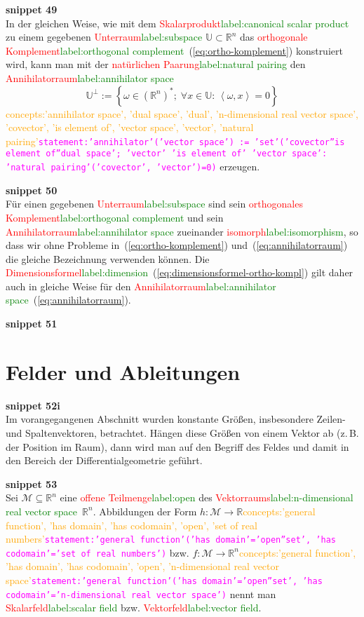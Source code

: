 \documentclass[a4paper,twoside,english,ngerman,deutsch,german,sectrefs,envcountsame,envcountchap]{svmono}
\newcommand{\setref}[2]{\textcolor{red}{#1}\textcolor{green}{#2}}
\newcommand{\snippet}[1]{\textbf{snippet #1}\\}
\newcommand{\eqnote}[2]{\textcolor{orange}{#1}\textcolor{magenta}{\texttt{#2}}}
\begin{document}
\snippet{49}
In der gleichen Weise, wie mit dem \setref{Skalarprodukt}{label:canonical scalar product} zu einem gegebenen \setref{Unterraum}{label:subspace} $\mathbb{U}\subset{\mathbb{R}}^{n}$ das \setref{orthogonale Komplement}{label:orthogonal complement}~(\eqref{eq:ortho-komplement}) konstruiert wird, kann man mit der \setref{natürlichen Paarung}{label:natural pairing} den \setref{Annihilatorraum}{label:annihilator space}
\begin{equation}
\mathbb{U}^{\perp}:=\left\{ \omega\in({\mathbb{R}}^{n})^{*};\;\forall x\in\mathbb{U}:\,\left\langle \omega,x\right\rangle =0\right\} \label{eq:annihilatorraum}
\end{equation}\eqnote{concepts:'annihilator space', 'dual space', 'dual', 'n-dimensional real vector space', 'covector', 'is element of', 'vector space', 'vector', 'natural pairing'}{statement:'annihilator'('vector space') := 'set'('covector''is element of''dual space'; 'vector' 'is element of' 'vector space': 'natural pairing'('covector', 'vector')=0)}
erzeugen.

\snippet{50}
Für einen gegebenen \setref{Unterraum}{label:subspace} sind sein \setref{orthogonales Komplement}{label:orthogonal complement} und sein \setref{Annihilatorraum}{label:annihilator space} zueinander \setref{isomorph}{label:isomorphism}, so dass wir ohne Probleme in~(\eqref{eq:ortho-komplement}) und~(\eqref{eq:annihilatorraum}) die gleiche Bezeichnung verwenden können. Die \setref{Dimensionsformel}{label:dimension}~(\eqref{eq:dimensionsformel-ortho-kompl}) gilt daher auch in gleiche Weise für den \setref{Annihilatorraum}{label:annihilator space}~(\eqref{eq:annihilatorraum}).

\snippet{51}
\section{Felder und Ableitungen\label{sec:Felder-und-Ableitungen}}

\snippet{52i}
Im vorangegangenen Abschnitt wurden konstante Größen, insbesondere Zeilen- und Spaltenvektoren, betrachtet. Hängen diese Größen von einem Vektor ab (z.\,B. der Position im Raum), dann wird man auf den Begriff des Feldes und damit in den Bereich der Differentialgeometrie geführt.

\snippet{53}
Sei $\mathcal{M}\subseteq{\mathbb{R}}^{n}$ eine \setref{offene Teilmenge}{label:open} des \setref{Vektorraums}{label:n-dimensional real vector space}~${\mathbb{R}}^{n}$. Abbildungen der Form $h:\mathcal{M}\to{\mathbb{R}}$\eqnote{concepts:'general function', 'has domain', 'has codomain', 'open', 'set of real numbers'}{statement:'general function'('has domain'='open''set', 'has codomain'='set of real numbers')} bzw. $f:\mathcal{M}\to{\mathbb{R}}^{n}$\eqnote{concepts:'general function', 'has domain', 'has codomain', 'open', 'n-dimensional real vector space'}{statement:'general function'('has domain'='open''set', 'has codomain'='n-dimensional real vector space')} nennt man \setref{Skalarfeld}{label:scalar field} bzw. \setref{Vektorfeld}{label:vector field}.
\end{document}
